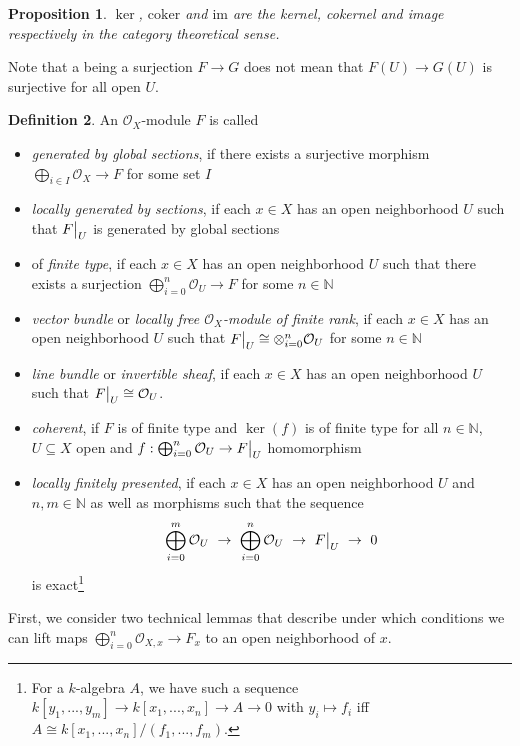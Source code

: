 \documentclass{scrartcl}
\newcommand{\N}{\mathbb{N}}
\newcommand{\im}{\mathrm{im}}
\renewcommand{\O}{\mathcal{O}}
\newcommand\restr[2]{{
    \left.\kern-\nulldelimiterspace
    #1
    \vphantom{\big|}
    \right|_{#2}
}}
\newtheorem{prop}{Proposition}[section]
\theoremstyle{definition}
\newtheorem{definition}[prop]{Definition}
\begin{document}
\begin{prop}
    $\ker$, $\mathrm{coker}$ and $\im$ are the kernel, cokernel and image respectively in the category theoretical sense.
\end{prop}
Note that a being a surjection $F \to G$ does not mean that $F(U) \to G(U)$ is surjective for all open $U$. 
\begin{definition}
    An $\O_X$-module $F$ is called
    \begin{itemize}
        \item \emph{generated by global sections}, if there exists a surjective morphism $\bigoplus_{i \in I} \O_X \to F$ for some set $I$
        \item \emph{locally generated by sections}, if each $x \in X$ has an open neighborhood $U$ such that $\restr{F}{U}$ is generated by global sections
        \item of \emph{finite type}, if each $x \in X$ has an open neighborhood $U$ such that there exists a surjection $\bigoplus_{i = 0}^n \O_U \to F$ for some $n \in \N$
        \item \emph{vector bundle} or \emph{locally free $\O_X$-module of finite rank}, if each $x \in X$ has an open neighborhood $U$ such that $\restr{F}{U} \cong \otimes_{i = 0}^n \O_U$ for some $n \in \N$
        \item \emph{line bundle} or \emph{invertible sheaf}, if each $x \in X$ has an open neighborhood $U$ such that $\restr{F}{U} \cong \O_U$.
        \item \emph{coherent}, if $F$ is of finite type and $\ker(f)$ is of finite type for all $n \in \N$, $U \subseteq X$ open and $f: \bigoplus_{i = 0}^n \O_U \to \restr{F}{U}$ homomorphism
        \item \emph{locally finitely presented}, if each $x \in X$ has an open neighborhood $U$ and $n, m \in \N$ as well as morphisms such that the sequence
        \begin{equation*}
            \bigoplus_{i = 0}^m \O_U \ \to \ \bigoplus_{i = 0}^n \O_U \ \to \ \restr{F}{U} \ \to \ 0
        \end{equation*}
        is exact\footnote{For a $k$-algebra $A$, we have such a sequence $k[y_1, ..., y_m] \to k[x_1, ..., x_n] \to A \to 0$ with $y_i \mapsto f_i$ iff $A \cong k[x_1, ..., x_n]/(f_1, ..., f_m)$.}
    \end{itemize}
\end{definition}
First, we consider two technical lemmas that describe under which conditions we can lift maps $\bigoplus_{i = 0}^n \O_{X, x} \to F_x$ to an open neighborhood of $x$.
\end{document}

